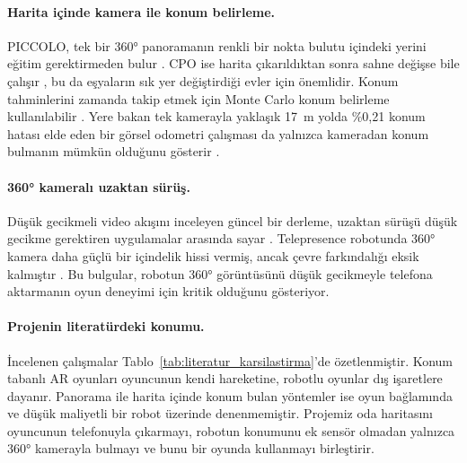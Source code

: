 \documentclass[11pt,a4paper]{article}
\begin{document}
\paragraph{Harita içinde kamera ile konum belirleme.}
PICCOLO, tek bir 360° panoramanın renkli bir nokta bulutu içindeki yerini eğitim gerektirmeden bulur \cite{kim2021piccolo}. CPO ise harita çıkarıldıktan sonra sahne değişse bile çalışır \cite{kim2022cpo}, bu da eşyaların sık yer değiştirdiği evler için önemlidir. Konum tahminlerini zamanda takip etmek için Monte Carlo konum belirleme kullanılabilir \cite{dellaert1999mcl}. Yere bakan tek kamerayla yaklaşık 17~m yolda \%0,21 konum hatası elde eden bir görsel odometri çalışması da yalnızca kameradan konum bulmanın mümkün olduğunu gösterir \cite{patruno2020visual}.

\paragraph{360° kameralı uzaktan sürüş.}
Düşük gecikmeli video akışını inceleyen güncel bir derleme, uzaktan sürüşü düşük gecikme gerektiren uygulamalar arasında sayar \cite{tang2026lowlatency}. Telepresence robotunda 360° kamera daha güçlü bir içindelik hissi vermiş, ancak çevre farkındalığı eksik kalmıştır \cite{heshmat2018geocaching}. Bu bulgular, robotun 360° görüntüsünü düşük gecikmeyle telefona aktarmanın oyun deneyimi için kritik olduğunu gösteriyor.

\paragraph{Projenin literatürdeki konumu.}
İncelenen çalışmalar Tablo~\ref{tab:literatur_karsilastirma}'de özetlenmiştir. Konum tabanlı AR oyunları oyuncunun kendi hareketine, robotlu oyunlar dış işaretlere dayanır. Panorama ile harita içinde konum bulan yöntemler ise oyun bağlamında ve düşük maliyetli bir robot üzerinde denenmemiştir. Projemiz oda haritasını oyuncunun telefonuyla çıkarmayı, robotun konumunu ek sensör olmadan yalnızca 360° kamerayla bulmayı ve bunu bir oyunda kullanmayı birleştirir.
\end{document}
